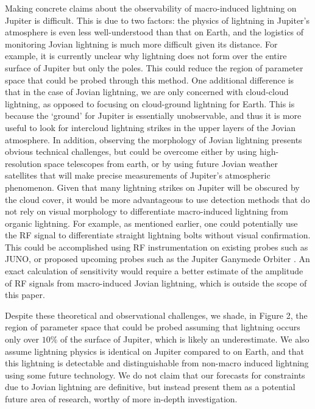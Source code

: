 \documentclass[%
 reprint,
 amsmath,amssymb,
 aps,
 nofootinbib, %
]{revtex4-2}
\begin{document}
    Making concrete claims about the observability of macro-induced lightning on Jupiter is difficult. This is due to two factors: the physics of lightning in Jupiter's atmosphere is even less well-understood than that on Earth, and the logistics of monitoring Jovian lightning is much more difficult given its distance. For example, it is currently unclear why lightning does not form over the entire surface of Jupiter but only the poles. This could reduce the region of parameter space that could be probed through this method. One additional difference is that in the case of Jovian lightning, we are only concerned with cloud-cloud lightning, as opposed to focusing on cloud-ground lightning for Earth. This is because the `ground' for Jupiter is essentially unobservable, and thus it is more useful to look for intercloud lightning strikes in the upper layers of the Jovian atmosphere. In addition, observing the morphology of Jovian lightning presents obvious technical challenges, but could be overcome either by using high-resolution space telescopes from earth, or by using future Jovian weather satellites that will make precise measurements of Jupiter's atmospheric phenomenon. Given that many lightning strikes on Jupiter will be obscured by the cloud cover, it would be more advantageous to use detection methods that do not rely on visual morphology to differentiate macro-induced lightning from organic lightning. For example, as mentioned earlier, one could potentially use the RF signal to differentiate straight lightning bolts without visual confirmation. This could be accomplished using RF instrumentation on existing probes such as JUNO, or proposed upcoming probes such as the Jupiter Ganymede Orbiter \citep{Brown2018}. An exact calculation of sensitivity would require a better estimate of the amplitude of RF signals from macro-induced Jovian lightning, which is outside the scope of this paper.

    Despite these theoretical and observational challenges, we shade, in Figure 2, the region of parameter space that could be probed assuming that lightning occurs only over $10\%$ of the surface of Jupiter, which is likely an underestimate. We also assume lightning physics is identical on Jupiter compared to on Earth, and that this lightning is detectable and distinguishable from non-macro induced lightning using some future technology. We do not claim that our forecasts for constraints due to Jovian lightning are definitive, but instead present them as a potential future area of research, worthy of more in-depth investigation.
\end{document}
